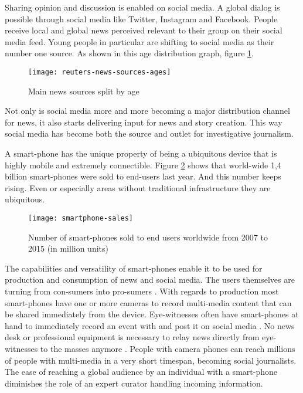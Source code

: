Sharing opinion and discussion is enabled on social media.
A global dialog is possible through social media like Twitter, Instagram and Facebook.
People receive local and global news perceived relevant to their group on their social media feed.
Young people in particular are shifting to social media as their number one source. \cite{reuters_social_media}
As shown in this age distribution graph, figure \ref{fig:reuters-news-sources-ages}.
\begin{figure}[H]
	\centering
	\texttt{[image: reuters-news-sources-ages]}
	\caption{Main news sources split by age \cite{reuters_social_media}}
	\label{fig:reuters-news-sources-ages}
\end{figure}
Not only is social media more and more becoming a major distribution channel for news, it also starts delivering input for news and story creation.
This way social media has become both the source and outlet for investigative journalism.

A smart-phone has the unique property of being a ubiquitous device that is highly mobile and extremely connectible.
Figure \ref{fig:smartphone-sales} shows that world-wide 1,4 billion smart-phones were sold to end-users last year.
And this number keeps rising.
Even or especially areas without traditional infrastructure they are ubiquitous.
\begin{figure}[H]
	\centering
	\texttt{[image: smartphone-sales]}
	\caption{Number of smart-phones sold to end users worldwide from 2007 to 2015 (in million units) \cite{smartphone-sales}}
	\label{fig:smartphone-sales}
\end{figure}

The capabilities and versatility of smart-phones enable it to be used for production and consumption of news and social media.
The users themselves are turning from con-sumers into pro-sumers \cite{??}.
With regards to production most smart-phones have one or more cameras to record multi-media content that can be shared immediately from the device.
Eye-witnesses often have smart-phones at hand to immediately record an event with and post it on social media \cite{paris-attacks}.
No news desk or professional equipment is necessary to relay news directly from eye-witnesses to the masses anymore \cite{belgium-attacks}.
People with camera phones can reach millions of people with multi-media in a very short timespan, becoming social journalists.
The ease of reaching a global audience by an individual with a smart-phone diminishes the role of an expert curator handling incoming information.

